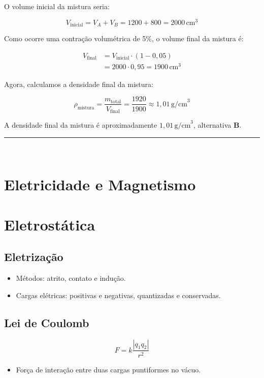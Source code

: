 \documentclass[a4paper,12pt]{article}
\begin{document}
\begin{flushleft}
\noindent
O volume inicial da mistura seria:

\[
V_{\text{inicial}} = V_A + V_B = 1200 + 800 = 2000\,\text{cm}^3
\]

\noindent
Como ocorre uma contração volumétrica de 5\%, o volume final da mistura é:

\begin{align*}
V_{\text{final}} &= V_{\text{inicial}} \cdot (1 - 0{,}05) \\
&= 2000 \cdot 0{,}95 = 1900\,\text{cm}^3
\end{align*}

\noindent
Agora, calculamos a densidade final da mistura:

\[
\rho_{\text{mistura}} = \frac{m_{\text{total}}}{V_{\text{final}}} = \frac{1920}{1900} \approx 1{,}01\,\text{g/cm}^3
\]

\noindent
A densidade final da mistura é aproximadamente \( \boxed{1{,}01\,\text{g/cm}^3} \), alternativa \colorbox{green!50}{\textbf{B}}.

\end{flushleft}

\noindent\rule{\linewidth}{0.6pt}\\

\section{Eletricidade e Magnetismo}

\section{Eletrostática}

\subsection{Eletrização}
\begin{itemize}
    \item Métodos: atrito, contato e indução.
    \item Cargas elétricas: positivas e negativas, quantizadas e conservadas.
\end{itemize}

\subsection{Lei de Coulomb}
\begin{equation*}
    F = k \frac{|q_1 q_2|}{r^2}
\end{equation*}
\begin{itemize}
    \item Força de interação entre duas cargas puntiformes no vácuo.
\end{itemize}
\end{document}
